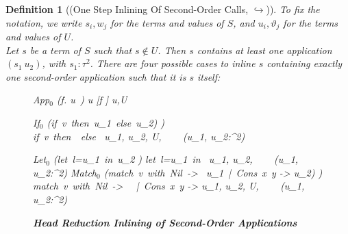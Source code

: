 \documentclass[a4paper,11pt,oneside]{article}
\theoremstyle{plain}
\newtheorem{definition}{Definition}[subsection]
\newcommand{\tmlet}[3]{let~#1=#2~in~#3}
\newcommand{\tmsbst}[3]{#1 [#2 \mapsfrom #3] }
\newcommand{\inlU}{\mathcal{U}}
\newcommand{\icarr}{\hookrightarrow}
\begin{document}
\begin{definition}[(One Step Inlining Of Second-Order Calls, $\icarr$)]
	To fix the notation, we write $s_i,w_j$ for the terms and values of $S$, and $u_i, 		
	\vartheta_j$  for the terms and values of $U$. \\
	
	Let $s$ be a term of $S$ such that $s \not\in U$. 
  Then $s$ contains at least one application $(s_1~u_2)$, with $s_1 : \tau^2$.
 There are four possible cases to inline $s$ containing exactly one second-order application such that it is $s$ itself:	
	\begin{figure}[H]
		\begin{footnotesize}
	\begin{adjustwidth}{-10em}{0em}

	\begin{multicols}{2}
	\hypertarget{Rule-def-I$_2$-App$_0$}{}
	\icrulehead
		{App$_0$}
		{(\lambda f. u~\vartheta)}
		{\tmsbst{u}{f}{\vartheta}}
		{u,\vartheta \in U} 
	\vspace*{0.5cm}
	
	\hypertarget{Rule-def-I$_2$-If$_0$}{}
	\icrulehead
		{If$_0$}
		{(\boldsymbol{(}if~v~then~u_1~else~u_2{)} \boldsymbol{\vartheta}) \\}
		{if~v~then~~else~}
		{u_1, u_2, \vartheta \in U, ~~~ (u_1, u_2:\tau^2)}	

	\icrulehead
		{Let$_0$\hypertarget{Rule-def-I$_2$-Let$_0$}{}}
		{(\boldsymbol{(}\tmlet{l}{u_1}{u_2}\boldsymbol{)} \boldsymbol{\vartheta})}
		{\tmlet{l}{u_1}{}} 
		{u_1, u_2, \vartheta \in\inlU~~~ (u_1, u_2:\tau^2)}	
		\vspace*{0.5cm}
	\icrulehead
		{Match$_0$\hypertarget{Rule-def-I$_2$-Match$_0$}{}}
		{(\boldsymbol{(}match~v~with~Nil~->~ u_1~|~Cons~x~y -> u_2{)} \boldsymbol{\vartheta}) \\}
		{match~v~with~Nil~->~ ~|~Cons~x~y -> }
		{u_1, u_2, \vartheta \in U, ~~~ (u_1, u_2:\tau^2)}				
	\end{multicols}
		\end{adjustwidth}	
		\caption{ \textbf{Head Reduction Inlining of Second-Order Applications}\hfill}
 	\label{fig:inl-app-h-d}
 		\end{footnotesize}
	\end{figure}


\end{definition}
\end{document}
